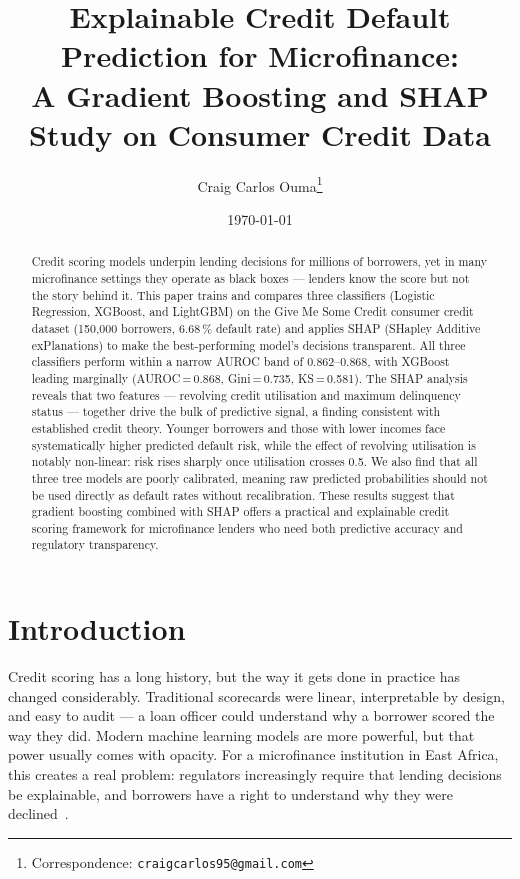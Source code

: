\documentclass[11pt]{article}
\title{\textbf{Explainable Credit Default Prediction for Microfinance:\\
A Gradient Boosting and SHAP Study on Consumer Credit Data}}
\author[1]{Craig Carlos Ouma\thanks{%
Correspondence: \texttt{craigcarlos95@gmail.com}}}
\affil[1]{Independent Researcher}
\date{\today}
\begin{document}
\maketitle

\begin{abstract}
\noindent
Credit scoring models underpin lending decisions for millions of borrowers, yet in many
microfinance settings they operate as black boxes --- lenders know the score but not the
story behind it. This paper trains and compares three classifiers (Logistic Regression,
XGBoost, and LightGBM) on the Give Me Some Credit consumer credit dataset (150,000
borrowers, 6.68\,\% default rate) and applies SHAP (SHapley Additive exPlanations)
to make the best-performing model's decisions transparent. All three classifiers perform
within a narrow AUROC band of 0.862--0.868, with XGBoost leading marginally
(AUROC\,=\,0.868, Gini\,=\,0.735, KS\,=\,0.581). The SHAP analysis reveals that two
features --- revolving credit utilisation and maximum delinquency status ---
together drive the bulk of predictive signal, a finding consistent with established
credit theory. Younger borrowers and those with lower incomes face systematically
higher predicted default risk, while the effect of revolving utilisation is
notably non-linear: risk rises sharply once utilisation crosses 0.5. We also find
that all three tree models are poorly calibrated, meaning raw predicted probabilities
should not be used directly as default rates without recalibration. These results
suggest that gradient boosting combined with SHAP offers a practical and explainable
credit scoring framework for microfinance lenders who need both predictive accuracy
and regulatory transparency.
\end{abstract}

\section{Introduction}

Credit scoring has a long history, but the way it gets done in practice has changed
considerably. Traditional scorecards were linear, interpretable by design, and easy
to audit --- a loan officer could understand why a borrower scored the way they did.
Modern machine learning models are more powerful, but that power usually comes with
opacity. For a microfinance institution in East Africa, this creates a real problem:
regulators increasingly require that lending decisions be explainable, and borrowers
have a right to understand why they were declined~\cite{barocas2023fairness}.
\end{document}
